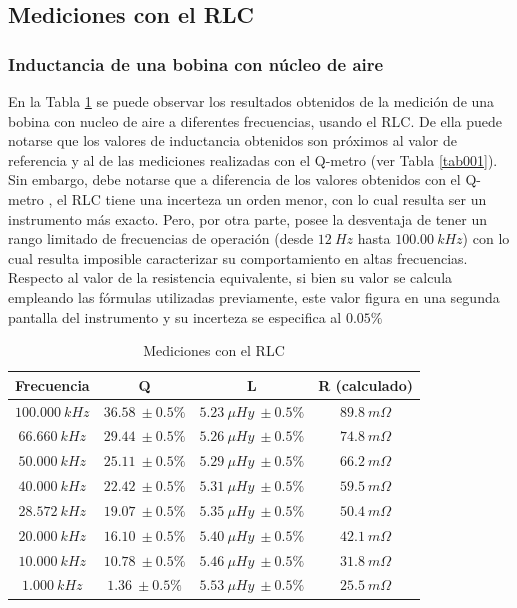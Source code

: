\documentclass[a4paper,10pt]{article}
\begin{document}
		\subsection{Mediciones con el RLC}		
		
		\subsubsection{Inductancia de una bobina con n\'ucleo de aire}
		En la Tabla \ref{tabRLCbobina} se puede observar los resultados obtenidos de la medici\'on de una bobina con nucleo de aire a diferentes frecuencias, usando el RLC. De ella puede notarse que los valores de inductancia obtenidos son pr\'oximos al valor de referencia y al de las mediciones realizadas con el Q-metro (ver Tabla \ref{tab001}). Sin embargo, debe notarse que a diferencia de los valores obtenidos con el Q-metro , el RLC tiene una incerteza un orden menor, con lo cual resulta ser un instrumento m\'as exacto.
		Pero, por otra parte, posee la desventaja de tener un rango limitado de frecuencias de operaci\'on (desde $12~Hz$ hasta $100.00~kHz$) con lo cual resulta imposible caracterizar su comportamiento en altas frecuencias.
		Respecto al valor de la resistencia equivalente, si bien su valor se calcula empleando las f\'ormulas utilizadas previamente, este valor figura en una segunda pantalla del instrumento y su incerteza se especifica al $0.05\%$
		\begin{table}[!htp]
					\centering
					\begin{tabular}{|c|c|c|c|}
						\hline
			    		Frecuencia & Q & L  & R (calculado) \\
						\hline
						$100.000~kHz$& $36.58~\pm0.5\%$ & $5.23~\mu Hy~\pm0.5\%$ &$ 89.8~m\Omega$ \\
						\hline
						$66.660~kHz$& $29.44~\pm0.5\%$ & $5.26~\mu Hy~\pm0.5\%$ &$ 74.8~m\Omega$ \\
						\hline
						$50.000~kHz$& $25.11~\pm0.5\%$ & $5.29~\mu Hy~\pm0.5\%$ &$ 66.2~m\Omega$ \\
						\hline  
						$40.000~kHz$& $22.42~\pm0.5\%$ & $5.31~\mu Hy~\pm0.5\%$ &$ 59.5~m\Omega$ \\
						\hline  										
						$28.572~kHz$& $19.07~\pm0.5\%$ & $5.35~\mu Hy~\pm0.5\%$ &$ 50.4~m\Omega$ \\
						\hline
						$20.000~kHz$& $16.10~\pm0.5\%$ & $5.40~\mu Hy~\pm0.5\%$ &$ 42.1~m\Omega$ \\
						\hline  
						$10.000~kHz$& $10.78~\pm0.5\%$ & $5.46~\mu Hy~\pm0.5\%$ &$ 31.8~m\Omega$ \\
						\hline 										
						$1.000~kHz$& $1.36~\pm0.5\%$ & $5.53~\mu Hy~\pm0.5\%$ &$ 25.5~m\Omega$ \\
						\hline 	  
					\end{tabular}
					\caption{Mediciones con el RLC} \label{tabRLCbobina}
				\end{table}
				
\end{document}
